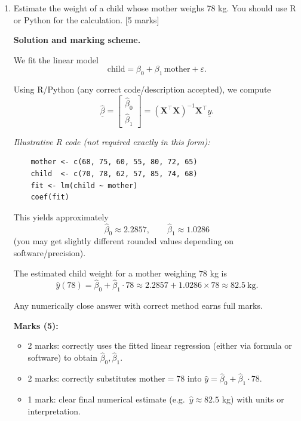 \documentclass{article}
\begin{document}
\begin{enumerate}[label=(\alph*)]
\begin{mdframed}[linecolor=black, linewidth=1pt]
    \textbf{Marks (5):}
    \begin{itemize}
      \item 3 marks: correct computation showing $\bm{H}^2 = \bm{H}$ (idempotence).
      \item 2 marks: correct transpose argument showing $\bm{H}^{\top} = \bm{H}$ (symmetry).
    \end{itemize}
    \end{mdframed}
    
    \item Estimate the weight of a child whose mother weighs 78 kg. You should use R or Python for the calculation. [5 marks]

    \begin{mdframed}[linecolor=black, linewidth=1pt]
    \textbf{Solution and marking scheme.}

    We fit the linear model
    \[
    \text{child} = \beta_0 + \beta_1\,\text{mother} + \varepsilon.
    \]
    
    Using R/Python (any correct code/description accepted), we compute
    \[
    \hat{\underline{\beta}} = 
    \begin{bmatrix}
    \hat{\beta}_0\\
    \hat{\beta}_1
    \end{bmatrix}
    = (\bm{X}^{\top}\bm{X})^{-1}\bm{X}^{\top}\underline{y}.
    \]
    
    \textit{Illustrative R code (not required exactly in this form):}
    \begin{verbatim}
    mother <- c(68, 75, 60, 55, 80, 72, 65)
    child  <- c(70, 78, 62, 57, 85, 74, 68)
    fit <- lm(child ~ mother)
    coef(fit)
    \end{verbatim}
    
    This yields approximately
    \[
    \hat{\beta}_0 \approx 2.2857,\qquad
    \hat{\beta}_1 \approx 1.0286
    \]
    (you may get slightly different rounded values depending on software/precision).
    
    The estimated child weight for a mother weighing $78$ kg is
    \[
    \hat{y}(78) = \hat{\beta}_0 + \hat{\beta}_1\cdot 78
                \approx 2.2857 + 1.0286\times 78
                \approx 82.5\ \text{kg}.
    \]
    
    Any numerically close answer with correct method earns full marks.
    
    \textbf{Marks (5):}
    \begin{itemize}
      \item 2 marks: correctly uses the fitted linear regression (either via formula or software) to obtain $\hat{\beta}_0,\hat{\beta}_1$.
      \item 2 marks: correctly substitutes $\text{mother}=78$ into $\hat{y} = \hat{\beta}_0+\hat{\beta}_1\cdot 78$.
      \item 1 mark: clear final numerical estimate (e.g.\ $\hat{y}\approx 82.5$ kg) with units or interpretation.
    \end{itemize}
    \end{mdframed}
    
\end{enumerate}
\end{document}
